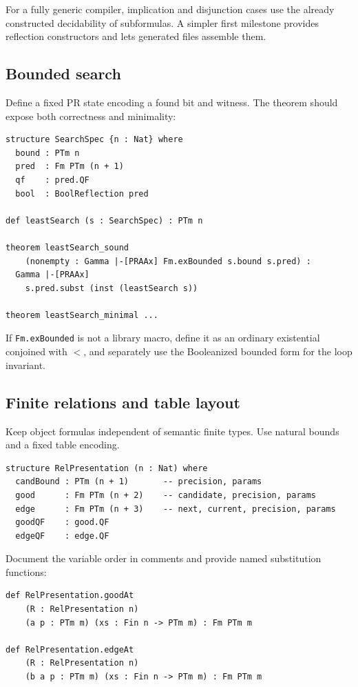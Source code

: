For a fully generic compiler, implication and disjunction cases use the already constructed decidability of subformulas.  A simpler first milestone provides reflection constructors and lets generated files assemble them.

\subsection{Bounded search}

Define a fixed PR state encoding a found bit and witness.  The theorem should expose both correctness and minimality:

\begin{lstlisting}[language={}]
structure SearchSpec {n : Nat} where
  bound : PTm n
  pred  : Fm PTm (n + 1)
  qf    : pred.QF
  bool  : BoolReflection pred

def leastSearch (s : SearchSpec) : PTm n

theorem leastSearch_sound
    (nonempty : Gamma |-[PRAAx] Fm.exBounded s.bound s.pred) :
  Gamma |-[PRAAx]
    s.pred.subst (inst (leastSearch s))

theorem leastSearch_minimal ...
\end{lstlisting}

If \texttt{Fm.exBounded} is not a library macro, define it as an ordinary existential conjoined with \(<\), and separately use the Booleanized bounded form for the loop invariant.

\subsection{Finite relations and table layout}

Keep object formulas independent of semantic finite types.  Use natural bounds and a fixed table encoding.

\begin{lstlisting}[language={}]
structure RelPresentation (n : Nat) where
  candBound : PTm (n + 1)       -- precision, params
  good      : Fm PTm (n + 2)    -- candidate, precision, params
  edge      : Fm PTm (n + 3)    -- next, current, precision, params
  goodQF    : good.QF
  edgeQF    : edge.QF
\end{lstlisting}

Document the variable order in comments and provide named substitution functions:

\begin{lstlisting}[language={}]
def RelPresentation.goodAt
    (R : RelPresentation n)
    (a p : PTm m) (xs : Fin n -> PTm m) : Fm PTm m

def RelPresentation.edgeAt
    (R : RelPresentation n)
    (b a p : PTm m) (xs : Fin n -> PTm m) : Fm PTm m
\end{lstlisting}

